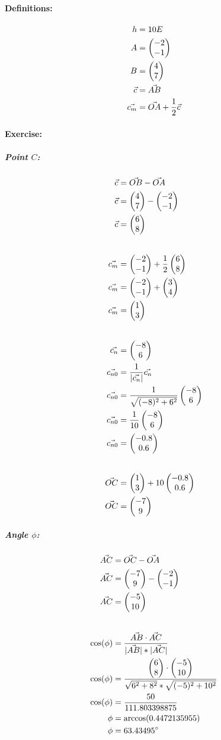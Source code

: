 \paragraph{Definitions:}
\begin{align}
    h &= \height E \\
    A &= \A \\
    B &= \B \\
    \vec{c} &= \vec{AB} \\
    \vec{c_m} &= \vec{OA} + \frac{1}{2} \vec{c}
\end{align}

\paragraph{Exercise:}
\subparagraph{Point $C$:}
\begin{align}
    \vec{c} &= \vec{OB} - \vec{OA} \\
    \vec{c} &= \B - \A \\
    \vec{c} &= \AB \\[20pt]
    \vec{c_m} &= \A + \frac{1}{2}\AB \\
    \vec{c_m} &= \A  + \ABhalf \\
    \vec{c_m} &= \ABmid \\[20pt]
    \vec{c_n} &= \ABnorm \\
    \vec{c_{n0}} &= \frac{1}{|\vec{c_n}|}\vec{c_n} \\
    \vec{c_{n0}} &= \frac{1}{\ABnrommag}\ABnorm \\
    \vec{c_{n0}} &= \frac{1}{10}\ABnorm \\
    \vec{c_{n0}} &= \ABmidzero \\[20pt]
    \vec{OC} &= \ABmid + \height\ABmidzero \\
    \vec{OC} &= \vOC
\end{align}

\subparagraph{Angle $\phi$:}
\begin{align}
    \vec{AC} &= \vec{OC} - \vec{OA} \\
    \vec{AC} &= \vOC - \A \\
    \vec{AC} &= \vAC \\[20pt]
    \cos(\phi) &= \frac{\vec{AB} \cdot \vec{AC}}{|\vec{AB}| * |\vec{AC}|} \\
    \cos(\phi) &= \frac{\AB \cdot \vAC}{\sqrt{6^2 + 8^2} * \sqrt{(-5)^2 + 10^2}} \\
    \cos(\phi) &= \frac{50}{111.803398875} \\
    \phi &= \arccos(0.4472135955) \\
    \phi &= 63.43495^\circ
\end{align}

